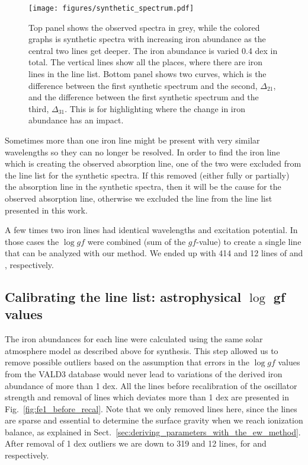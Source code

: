 \documentclass{aa}
\begin{document}
\begin{figure}[tpb]
    \centering
    \texttt{[image: figures/synthetic\_spectrum.pdf]}
    \caption{Top panel shows the observed spectra in grey, while the
    colored graphs is synthetic spectra with increasing iron abundance
    as the central two lines get deeper. The iron abundance is varied
    0.4 dex in total. The vertical lines show all the places, where there are
    iron lines in the line list. Bottom panel shows two curves, which is
    the difference between the first synthetic spectrum and the second,
    $\Delta_{21}$, and the difference between the first synthetic
    spectrum and the third, $\Delta_{31}$. This is for highlighting
    where the change in iron abundance has an impact.}
    \label{fig:synthesis}
\end{figure}


Sometimes more than one iron line might be present with very similar
wavelengths so they can no longer be resolved. In order to find the
iron line which is creating the observed absorption line, one of the
two were excluded from the line list for the synthetic spectra. If this
removed (either fully or partially) the absorption line in the synthetic
spectra, then it will be the cause for the observed absorption line,
otherwise we excluded the line from the line list presented in this
work.

A few times two iron lines had identical wavelengths and excitation
potential. In those cases the $\log \mathit{gf}$ were combined (sum of
the $\mathit{gf}$-value) to create a single line that can be analyzed
with our method. We ended up with 414 and 12 lines of  and
, respectively.


\subsection{Calibrating the line list: astrophysical $\log$ gf values}
\label{ssub:Recalibrating-the-atomic-data}

The iron abundances for each line were calculated using the same
solar atmosphere model as described above for synthesis. This step
allowed us to remove possible outliers based on the assumption that
errors in the $\log \mathit{gf}$ values from the VALD3 database
would never lead to variations of the derived iron abundance of more
than 1 dex. All the  lines before recalibration of
the oscillator strength and removal of lines which deviates more than
1 dex are presented in Fig.~\ref{fig:fe1_before_recal}.
Note that we only removed  lines here, since
the  lines are sparse and essential to determine the
surface gravity when we reach ionization balance, as explained in
Sect.~\ref{sec:deriving_parameters_with_the_ew_method}. After removal
of 1 dex outliers we are down to 319 and 12 lines, for  and
 respectively.
\end{document}
